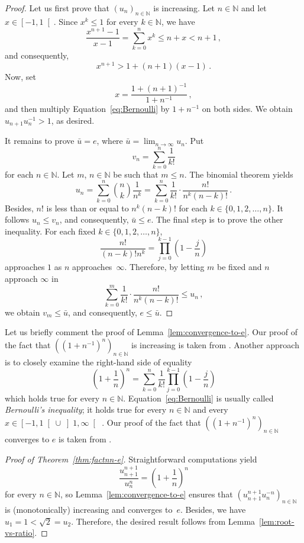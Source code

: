 \documentclass[12pt]{article}
\newcommand{\bN}{\mathbb{N}} %
\begin{document}
\begin{proof}
  Let us first prove that $\left( u_n \right)_{n \in \bN}$ is increasing.
  Let $n \in \bN$ and let $x \in \left[- 1, 1 \right[$.
  Since $x^k \le 1$  for every $k \in \bN$,
  we have     
  $$
  \frac{x^{n + 1} - 1}{x - 1} = \sum_{k = 0}^n x^k \le n + x < n + 1 \,, 
  $$
  and consequently, 
  \begin{equation} 
  x^{n + 1} > 1 + (n + 1)(x - 1) \,.
  \end{equation}
  Now, set
  $$
  x = \frac{1 + {(n + 1)}^{-1}} {1 + n^{-1}} \,, 
  $$
  and then multiply Equation~\eqref{eq:Bernoulli} by $1 + n^{-1}$ on both sides.
  We obtain $u_{n + 1} u_n^{-1} > 1$, as desired.
  
  It remains to prove $\bar u = e$, where $\bar u = \lim_{n \to \infty} u_n$.
  Put
  $$
  v_n = \sum_{k = 0}^n \frac{1}{k!} 
  $$
  for each $n \in \bN$.
  Let $m$, $n \in \bN$ be such that $m \le n$.
  The binomial theorem yields
  $$
  u_n
  = \sum_{k = 0}^n  \binom{n}{k} \frac{1}{n^k}
  = \sum_{k = 0}^n \frac{1}{k!} \cdot \frac{n!}{n^k {(n - k)}!} \, .
  $$
  Besides, $n!$ is less than or equal to $n^k {(n - k)}!$ for each $k \in \{ 0, 1, 2, \dotsc, n \}$.
  It follows $ u_n \le v_n$,  and consequently, $\bar u \le e$.
  The final step is to prove the other inequality.
 For each fixed $k \in \{ 0, 1, 2, \dotsc, n \}$, 
  $$
  \frac{n!}{{(n - k)}! n^k} = \prod_{j = 0}^{k - 1} \left( 1 - \frac{j}{n} \right) 
 $$
 approaches $1$ as $n$ approaches~$\infty$.
 Therefore, by letting $m$ be fixed and $n$ approach $\infty$ in 
 $$
  \sum_{k = 0}^m \frac{1}{k!} \cdot \frac{n!}{n^k {(n - k)}!} \le u_n \,, 
  $$
  we obtain $v_m \le \bar u$, and consequently, $e \le \bar u$.
\end{proof}


Let us briefly comment the proof of Lemma~\ref{lem:convergence-to-e}.
Our proof of the fact that $\left( \left( 1 + n^{-1} \right)^n  \right)_{n \in \bN}$
is increasing is taken from \cite{Wiener85}.
Another approach \cite{GiaquintaModicaApprox} is to closely examine the right-hand side of equality 
$$ 
\left(1 + \frac{1}{n} \right)^n = \sum_{k = 0}^n \frac{1}{k!} \prod_{j = 0}^{k - 1} \left(1 - \frac{j}{n} \right) 
$$
which holds true for every $n \in \bN$.
Equation~\eqref{eq:Bernoulli} is usually called \emph{Bernoulli's inequality};
it holds true for every $n \in \bN$ and every
$x \in \left[- 1, 1 \right[ \cup \left]1, \infty \right[$ \cite{MitrinovicAI}.
Our proof of the fact that
$\left( \left( 1 + n^{-1} \right)^n  \right)_{n \in \bN}$ converges to $e$ is taken from \cite{RudinPrinciples}.


\begin{proof}[Proof of Theorem~\ref{thm:factnn-e}]
  Straightforward computations yield
  $$
  \frac{u_{n + 1}^{n + 1}}{u_n^n} 
  = \left(1 + \frac{1}{n} \right)^n  
  $$
  for every $n \in \bN$,
  so Lemma~\ref{lem:convergence-to-e} ensures that 
  $\left( u_{n + 1}^{n + 1} u_n^{- n} \right)_{n \in \bN}$ is (monotonically) increasing and converges to~$e$.
  Besides, we have $u_1 = 1 < \sqrt{2} = u_2$.
  Therefore, the desired result follows from Lemma~\ref{lem:root-vs-ratio}.
\end{proof} 



\end{document}
